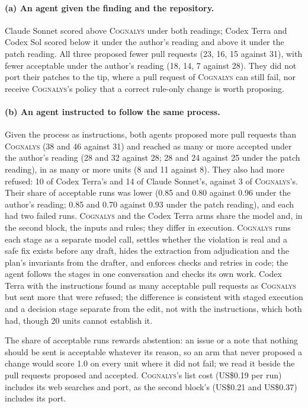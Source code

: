 \documentclass[conference]{IEEEtran}
\newcommand{\system}{\textsc{Cognalys}}
\begin{document}
\paragraph{(a) An agent given the finding and the repository.} Claude Sonnet
scored above \system{} under both readings; Codex Terra and Codex Sol scored
below it under the author's reading and above it under the patch reading. All
three proposed fewer pull requests (23, 16, 15 against 31), with fewer
acceptable under the author's reading (18, 14, 7 against 28). They did not port
their patches to the tip, where a pull request of \system{} can still fail, nor
receive \system{}'s policy that a correct rule-only change is worth proposing.

\paragraph{(b) An agent instructed to follow the same process.}
Given the process as instructions, both agents proposed more pull requests
than \system{} (38 and 46 against 31) and reached as many or more accepted
under the author's reading (28 and 32 against 28; 28 and 24 against 25 under
the patch reading), in as many or more units (8 and 11 against 8). They also
had more refused: 10 of Codex Terra's and 14 of Claude Sonnet's, against 3 of
\system{}'s. Their share of acceptable runs was lower (0.85 and 0.80 against
0.96 under the author's reading; 0.85 and 0.70 against 0.93 under the patch
reading), and each had two failed runs.
\system{} and the Codex Terra arms share the model and, in the second block,
the inputs and rules; they differ in execution. \system{} runs each stage as a
separate model call, settles whether the violation is real and a safe fix
exists before any draft, hides the extraction from adjudication and the plan's
invariants from the drafter, and enforces checks and retries in code; the agent
follows the stages in one conversation and checks its own work.
Codex Terra with the instructions found as many acceptable pull requests as
\system{} but sent more that were refused; the difference is consistent with
staged execution and a decision stage separate from the edit, not with the
instructions, which both had, though 20 units cannot establish it.

The share of acceptable runs rewards abstention: an issue or a note that
nothing should be sent is acceptable whatever its reason, so an arm that never
proposed a change would score 1.0 on every unit where it did not fail; we
read it beside the pull requests proposed and accepted. \system{}'s list cost
(US\$0.19 per run) includes its web searches and port, as the second block's
(US\$0.21 and US\$0.37) includes its port.
\end{document}
